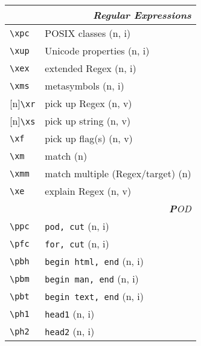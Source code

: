 \documentclass[oneside,10pt,landscape,DIV17]{scrartcl}
\newcommand{\Rep}{{\scriptsize{[n]}}}
\begin{document}
\begin{multicols}{3}
\begin{center}
%
\begin{tabular}[]{|p{11mm}|p{60mm}|}
\hline
\multicolumn{2}{|r|}{\textsl{Regular E\textbf{x}pressions}}     \\[1.0ex]
\hline     \verb'\xpc'&  POSIX classes                 \hfill (n, i)\\
\hline     \verb'\xup'&  Unicode properties            \hfill (n, i)\\
\hline     \verb'\xex'&  extended Regex                \hfill (n, i)\\
\hline     \verb'\xms'&  metasymbols                   \hfill (n, i)\\
%
\hline \Rep\verb'\xr' &  pick up Regex                 \hfill (n, v)\\
\hline \Rep\verb'\xs' &  pick up string                \hfill (n, v)\\
\hline     \verb'\xf' &  pick up flag(s)               \hfill (n, v)\\
\hline     \verb'\xm' &  match                         \hfill (n)   \\
\hline     \verb'\xmm'&  match multiple (Regex/target) \hfill (n)   \\
\hline     \verb'\xe' &  explain Regex                 \hfill (n, v)\\
\hline
\hline
\multicolumn{2}{|r|}{\textsl{\textbf{P}OD}}                       \\[1.0ex]
\hline \verb'\ppc'    & \verb'pod, cut'                 \hfill (n, i)\\
\hline \verb'\pfc'    & \verb'for, cut'                 \hfill (n, i)\\
\hline \verb'\pbh'    & \verb'begin html, end'          \hfill (n, i)\\
\hline \verb'\pbm'    & \verb'begin man, end'           \hfill (n, i)\\
\hline \verb'\pbt'    & \verb'begin text, end'          \hfill (n, i)\\
\hline \verb'\ph1'    & \verb'head1'                    \hfill (n, i)\\
\hline \verb'\ph2'    & \verb'head2'                    \hfill (n, i)\\

\end{tabular}
\end{center}
\end{multicols}
\end{document}
